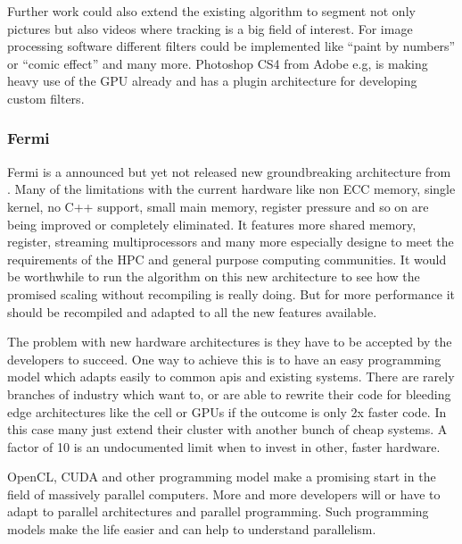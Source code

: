Further work could also extend the existing algorithm to segment not only pictures 
but also videos where tracking is a big field of interest. For image processing
software different filters could be implemented like ``paint by numbers'' or 
``comic effect'' and many more. Photoshop \gls{CS4} from Adobe e.g, is making heavy
use of the \gls{GPU} already and has a plugin architecture for developing custom
filters.  
 
\subsubsection{Fermi} %
\label{ssub:fermi}
Fermi is a announced but yet not released new groundbreaking architecture from
{}. Many of the limitations with the current hardware like 
non \gls{ECC} memory, single kernel, no C++ support, small main memory, register
pressure and so on are being improved or completely eliminated. It features more
shared memory, register, streaming multiprocessors and many more especially
designe to meet the requirements of the \gls{HPC} and general purpose computing
communities. It would be worthwhile to run the algorithm on this new architecture
to see how the promised scaling without recompiling is really doing. But for more
performance it should be recompiled and adapted to all the new features available.

The problem with new hardware architectures is they have to be accepted by the
developers to succeed. One way to achieve this is to have an easy programming
model which adapts easily to common apis and existing systems. There are rarely
branches of industry which want to, or are able to rewrite their code for
bleeding edge architectures like the cell or \glspl{GPU} if the outcome is only
2x faster code. In this case many just extend their cluster with another bunch
of cheap systems. A factor of 10 is an undocumented limit when to invest in
other, faster hardware.

OpenCL, \gls{CUDA} and other programming model make a promising start in the field
of massively parallel computers. More and more developers will or have to adapt to
parallel architectures and parallel programming. Such programming models make 
the life easier and can help to understand parallelism.





